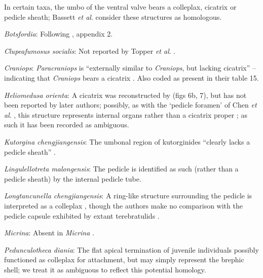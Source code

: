 \documentclass[openany]{book}
\theoremstyle{definition}
\theoremstyle{definition}
\theoremstyle{definition}
\theoremstyle{remark}
\begin{document}
In certain taxa, the umbo of the ventral valve bears a colleplax,
cicatrix or pedicle sheath; Bassett \emph{et al}.
\citeyearpar{Bassett2008Earlyontogeny} consider these structures as
homologous.

\hypertarget{Botsfordia-coding-116}{}
\emph{Botsfordia}: Following \citet{Williams1998Thediversity}, appendix
2.

\hypertarget{Clupeafumosus_socialis-coding-116}{}
\emph{Clupeafumosus socialis}: Not reported by Topper \emph{et al}.
\citeyearpar{Topper2013Reappraisalof}.

\hypertarget{Craniops-coding-116}{}
\emph{Craniops}: \emph{Paracraniops} is ``externally similar to
\emph{Craniops}, but lacking cicatrix'' -- indicating that
\emph{Craniops} bears a cicatrix
\citep{Williams2000LinguliformeaCraniiformea}. Also coded as present in
their table 15.

\hypertarget{Heliomedusa_orienta-coding-116}{}
\emph{Heliomedusa orienta}: A cicatrix was reconstructed by
\citet{Jin1992Revisionof} (figs 6b, 7), but has not been reported by
later authors; possibly, as with the `pedicle foramen' of Chen \emph{et
al}. \citeyearpar{Chen2007Reinterpretationof}, this structure represents
internal organs rather than a cicatrix proper
\citep{Zhang2009Architectureand}; as such it has been recorded as
ambiguous.

\hypertarget{Kutorgina_chengjiangensis-coding-116}{}
\emph{Kutorgina chengjiangensis}: The umbonal region of kutorginides
``clearly lacks a pedicle sheath'' \citep{Holmer2018Theattachment}.

\hypertarget{Lingulellotreta_malongensis-coding-116}{}
\emph{Lingulellotreta malongensis}: The pedicle is identified as such
(rather than a pedicle sheath) by the internal pedicle tube.

\hypertarget{Longtancunella_chengjiangensis-coding-116}{}
\emph{Longtancunella chengjiangensis}: A ring-like structure surrounding
the pedicle is interpreted as a colleplax
\citep{Zhang2011Theexceptionally}, though the authors make no comparison
with the pedicle capsule exhibited by extant terebratulids
\citep[see][]{Holmer2018Evolutionarysignificance}.

\hypertarget{Micrina-coding-116}{}
\emph{Micrina}: Absent in \emph{Micrina} \citep{Holmer2011Firstrecord}.

\hypertarget{Pedunculotheca_diania-coding-116}{}
\emph{Pedunculotheca diania}: The flat apical termination of juvenile
individuals possibly functioned as colleplax for attachment, but may
simply represent the brephic shell; we treat it as ambiguous to reflect
this potential homology.
\end{document}
